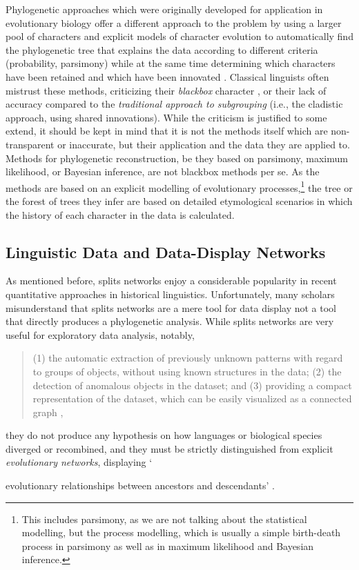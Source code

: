 \documentclass[svgnames,12pt]{scrartcl}
\begin{document}
{Phylogenetic approaches which were originally developed for application in evolutionary biology
offer a different approach to the problem by using a larger pool of characters and explicit models
of character evolution to automatically find the phylogenetic tree that explains the data according
to different criteria (probability, parsimony) while at the same time determining which characters
have been retained and which have been innovated \citep{Greenhill2012}. Classical linguists often
mistrust these methods, criticizing their \emph{blackbox} character \citep{Prokic2013}, or their
lack of
accuracy \citep{Holm2007} compared to the \emph{traditional approach to subgrouping} (i.e., the
cladistic approach, using shared innovations). While the criticism is justified to some extend, it
should be kept in mind that it is not the methods itself which are non-transparent or inaccurate, but
their application and the data they are applied to.
Methods for phylogenetic reconstruction, be they based on parsimony, maximum likelihood, or Bayesian
inference, are not blackbox methods per se. As the methods are based on an explicit modelling of
evolutionary processes,\footnote{This includes parsimony, as we are not talking about the
statistical modelling, but the process modelling, which is usually a simple birth-death process in
parsimony as well as in maximum likelihood and Bayesian inference.} the tree or the forest of trees
they infer are based on detailed etymological scenarios in which the history of each character in
the data is calculated. 

\subsection{Linguistic Data and Data-Display Networks}
As mentioned before, splits networks enjoy a considerable popularity in recent quantitative approaches
in historical linguistics.
Unfortunately, many scholars misunderstand
that splits networks are a mere tool for data display \citep{Morrison2010} not a tool that directly
produces a phylogenetic analysis. While splits
networks are very useful for exploratory data analysis, notably, 
\begin{quote}
(1) the automatic extraction of previously unknown patterns with regard to groups of
objects, without using known structures in the data;
(2) the detection of anomalous objects in the dataset;
and (3) providing a compact representation of the
dataset, which can be easily visualized as a connected
graph \citep[2]{Morrison2014b},
\end{quote}
they do not produce any hypothesis on how languages or biological species diverged or recombined, and they must be
strictly distinguished from explicit \emph{evolutionary networks}, displaying `{evolutionary
relationships between ancestors and descendants' \citep[43]{Morrison2011}.
 
}}
\end{document}
